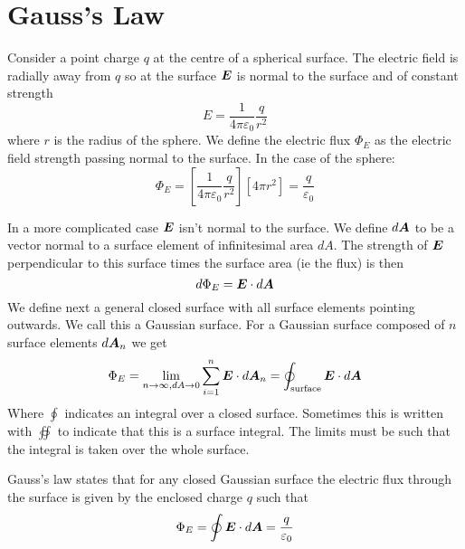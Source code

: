 \documentclass{article}
\begin{document}
    \section{Gauss's Law}
    Consider a point charge \(q\) at the centre of a spherical surface.
    The electric field is radially away from \(q\) so at the surface \(\bm{E}\) is normal to the surface and of constant strength
    \[E = \frac{1}{4\pi\varepsilon_0}\frac{q}{r^2}\]
    where \(r\) is the radius of the sphere.
    We define the electric flux \(\Phi_E\) as the electric field strength passing normal to the surface.
    In the case of the sphere:
    \[\Phi_E = \left[\frac{1}{4\pi\varepsilon_0}\frac{q}{r^2}\right]\left[4\pi r^2\right] = \frac{q}{\varepsilon_0}\]
    
    In a more complicated case \(\bm{E}\) isn't normal to the surface.
    We define \(d\bm{A}\) to be a vector normal to a surface element of infinitesimal area \(dA\).
    The strength of \(\bm{E}\) perpendicular to this surface times the surface area (ie the flux) is then
    \[d\Phi_E = \bm{E}\cdot d\bm{A}\]
    We define next a general closed surface with all surface elements pointing outwards.
    We call this a Gaussian surface.
    For a Gaussian surface composed of \(n\) surface elements \(d\bm{A}_n\) we get
    \[\Phi_E = \lim_{n\to \infty, dA\to 0}\sum_{i=1}^{n}\bm{E}\cdot d\bm{A}_n = \oint_{\text{surface}} \bm{E}\cdot d\bm{A}\]
    Where \(\oint\) indicates an integral over a closed surface.
    Sometimes this is written with \(\oiint\) to indicate that this is a surface integral.
    The limits must be such that the integral is taken over the whole surface.
    
    Gauss's law states that for any closed Gaussian surface the electric flux through the surface is given by the enclosed charge \(q\) such that
    \[\Phi_E = \oint \bm{E}\cdot d\bm{A} = \frac{q}{\varepsilon_0}\]
    
\end{document}
